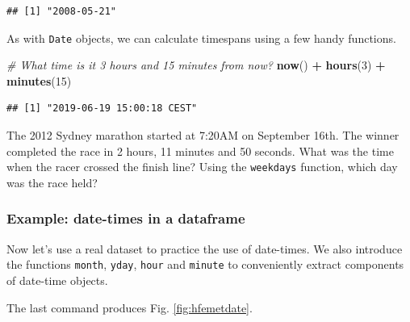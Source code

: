 \documentclass[]{book}
\newenvironment{Shaded}{\begin{snugshade}}{\end{snugshade}}
\newcommand{\CommentTok}[1]{\textcolor[rgb]{0.56,0.35,0.01}{\textit{#1}}}
\newcommand{\DecValTok}[1]{\textcolor[rgb]{0.00,0.00,0.81}{#1}}
\newcommand{\KeywordTok}[1]{\textcolor[rgb]{0.13,0.29,0.53}{\textbf{#1}}}
\newcommand{\NormalTok}[1]{#1}
\newcommand{\OperatorTok}[1]{\textcolor[rgb]{0.81,0.36,0.00}{\textbf{#1}}}
\newcommand{\StringTok}[1]{\textcolor[rgb]{0.31,0.60,0.02}{#1}}
\let\BeginKnitrBlock\begin \let\EndKnitrBlock\end
\begin{document}
\begin{verbatim}
## [1] "2008-05-21"
\end{verbatim}

As with \texttt{Date} objects, we can calculate timespans using a few handy functions.

\begin{Shaded}
\begin{Highlighting}[]
\CommentTok{# What time is it 3 hours and 15 minutes from now?}
\KeywordTok{now}\NormalTok{() }\OperatorTok{+}\StringTok{ }\KeywordTok{hours}\NormalTok{(}\DecValTok{3}\NormalTok{) }\OperatorTok{+}\StringTok{ }\KeywordTok{minutes}\NormalTok{(}\DecValTok{15}\NormalTok{)}
\end{Highlighting}
\end{Shaded}

\begin{verbatim}
## [1] "2019-06-19 15:00:18 CEST"
\end{verbatim}

\BeginKnitrBlock{rmdtry}
The 2012 Sydney marathon started at 7:20AM on September 16th. The winner completed the race in 2 hours, 11 minutes and 50 seconds. What was the time when the racer crossed the finish line? Using the \texttt{weekdays} function, which day was the race held?
\EndKnitrBlock{rmdtry}

\hypertarget{example-date-times-in-a-dataframe}{%
\subsubsection{Example: date-times in a dataframe}\label{example-date-times-in-a-dataframe}}

Now let's use a real dataset to practice the use of date-times. We also introduce the functions \texttt{month}, \texttt{yday}, \texttt{hour} and \texttt{minute} to conveniently extract components of date-time objects.

The last command produces Fig. \ref{fig:hfemetdate}.
\end{document}
